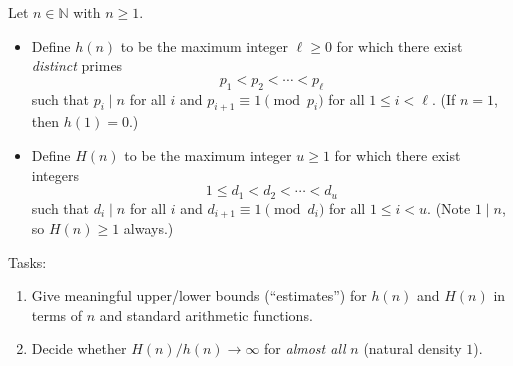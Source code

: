 Let $n\in\mathbb{N}$ with $n\ge 1$.
\begin{itemize}
\item Define $h(n)$ to be the maximum integer $\ell\ge 0$ for which there exist \emph{distinct} primes
  \[p_1<p_2<\cdots<p_\ell\]
  such that $p_i\mid n$ for all $i$ and $p_{i+1}\equiv 1\pmod{p_i}$ for all $1\le i<\ell$.
  (If $n=1$, then $h(1)=0$.)
\item Define $H(n)$ to be the maximum integer $u\ge 1$ for which there exist integers
  \[1\le d_1<d_2<\cdots<d_u\]
  such that $d_i\mid n$ for all $i$ and $d_{i+1}\equiv 1\pmod{d_i}$ for all $1\le i<u$.
  (Note $1\mid n$, so $H(n)\ge 1$ always.)
\end{itemize}
Tasks:
\begin{enumerate}
\item Give meaningful upper/lower bounds (``estimates'') for $h(n)$ and $H(n)$ in terms of $n$ and standard arithmetic functions.
\item Decide whether $H(n)/h(n)\to\infty$ for \emph{almost all} $n$ (natural density $1$).
\end{enumerate}
